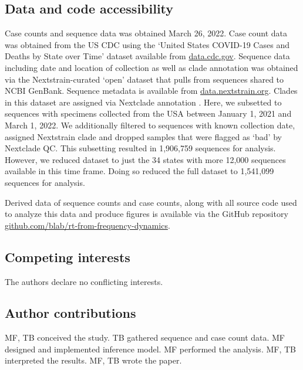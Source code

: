 \subsection*{Data and code accessibility}

Case counts and sequence data was obtained March 26, 2022.
Case count data was obtained from the US CDC using the `United States COVID-19 Cases and Deaths by State over Time' dataset available from \href{https://data.cdc.gov/Case-Surveillance/United-States-COVID-19-Cases-and-Deaths-by-State-o/9mfq-cb36}{data.cdc.gov}.
Sequence data including date and location of collection as well as clade annotation was obtained via the Nextstrain-curated `open' dataset \cite{Hadfield2018} that pulls from sequences shared to NCBI GenBank.
Sequence metadata is available from \href{https://docs.nextstrain.org/projects/ncov/en/latest/reference/remote_inputs.html}{data.nextstrain.org}.
Clades in this dataset are assigned via Nextclade annotation \cite{aksamentov2021nextclade}.
Here, we subsetted to sequences with specimens collected from the USA between January 1, 2021 and March 1, 2022.
We additionally filtered to sequences with known collection date, assigned Nextstrain clade and dropped samples that were flagged as `bad' by Nextclade QC.
This subsetting resulted in 1,906,759 sequences for analysis.
However, we reduced dataset to just the 34 states with more 12,000 sequences available in this time frame.
Doing so reduced the full dataset to 1,541,099 sequences for analysis.


Derived data of sequence counts and case counts, along with all source code used to analyze this data and produce figures is available via the GitHub repository \href{https://github.com/blab/rt-from-frequency-dynamics/}{github.com/blab/rt-from-frequency-dynamics}.

\subsection*{Competing interests}%

The authors declare no conflicting interests.

\subsection*{Author contributions}

MF, TB conceived the study.
TB gathered sequence and case count data.
MF designed and implemented inference model.
MF performed the analysis.
MF, TB interpreted the results.
MF, TB wrote the paper.

